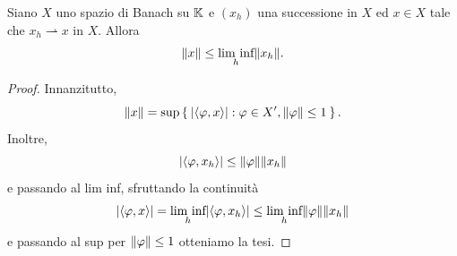\begin{proposizione}
Siano $X$ uno spazio di Banach su $\mathbb{K}$ e $(x_h)$ una successione in $X$ ed $x \in X$ tale che $x_h \rightharpoonup x$ in $X$. Allora
\[ \lVert x\rVert \le \underset{h}{\textup{lim inf}} \lVert x_h\rVert. \]
\end{proposizione}
\begin{proof}
Innanzitutto, 
\[ \lVert x\rVert = \sup \Set{\lvert\braket{\varphi,x}\rvert :  \varphi \in X', \lVert\varphi\rVert\le 1}. \]
Inoltre,
\[ \lvert\braket{\varphi,x_h}\rvert \le \lVert\varphi\rVert\lVert x_h\rVert \]
e passando al lim inf, sfruttando la continuità
\[ \lvert\braket{\varphi, x}\rvert = \underset{h}{\textup{lim inf}}\lvert\braket{\varphi,x_h}\rvert \le \underset{h}{\textup{lim inf}}\lVert\varphi\rVert\lVert x_h\rVert \]
e passando al sup per $\lVert\varphi\rVert \le 1$ otteniamo la tesi.
\end{proof}

